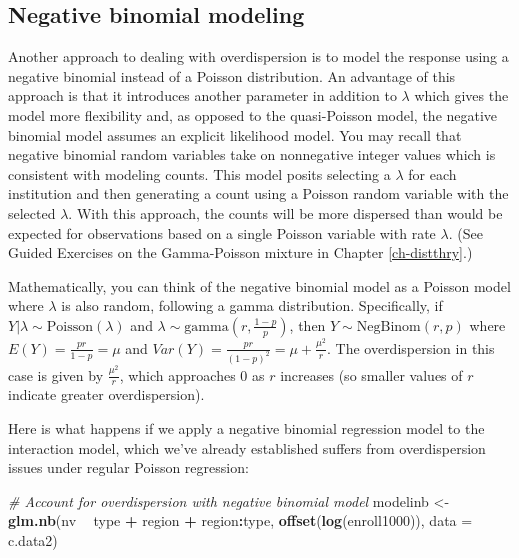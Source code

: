 \documentclass[
]{krantz}
\newenvironment{Shaded}{\begin{snugshade}}{\end{snugshade}}
\newcommand{\CommentTok}[1]{\textcolor[rgb]{0.37,0.37,0.37}{\textit{#1}}}
\newcommand{\DataTypeTok}[1]{\textcolor[rgb]{0.27,0.27,0.27}{#1}}
\newcommand{\KeywordTok}[1]{\textcolor[rgb]{0.27,0.27,0.27}{\textbf{#1}}}
\newcommand{\NormalTok}[1]{#1}
\newcommand{\OperatorTok}[1]{\textcolor[rgb]{0.43,0.43,0.43}{\textbf{#1}}}
\newcommand{\StringTok}[1]{\textcolor[rgb]{0.5,0.5,0.5}{#1}}
\begin{document}
\hypertarget{negative-binomial-modeling}{%
\subsection{Negative binomial modeling}\label{negative-binomial-modeling}}

Another approach to dealing with overdispersion is to model the response using a negative binomial instead of a Poisson distribution. An advantage of this approach is that it introduces another parameter in addition to \(\lambda\) which gives the model more flexibility and, as opposed to the quasi-Poisson model, the negative binomial model assumes an explicit likelihood model. You may recall that negative binomial random variables take on nonnegative integer values which is consistent with modeling counts. This model posits selecting a \(\lambda\) for each institution and then generating a count using a Poisson random variable with the selected \(\lambda\). With this approach, the counts will be more dispersed than would be expected for observations based on a single Poisson variable with rate \(\lambda\). (See Guided Exercises on the Gamma-Poisson mixture in Chapter \ref{ch-distthry}.)

Mathematically, you can think of the negative binomial model as a Poisson model where \(\lambda\) is also random, following a gamma distribution. Specifically, if \(Y|\lambda \sim \textrm{Poisson}(\lambda)\) and \(\lambda \sim \textrm{gamma}(r,\frac{1-p}{p})\), then \(Y \sim \textrm{NegBinom}(r,p)\) where \(E(Y)=\frac{pr}{1-p}=\mu\) and \(Var(Y)=\frac{pr}{(1-p)^2}=\mu+\frac{\mu^2}{r}\). The overdispersion in this case is given by \(\frac{\mu^2}{r}\), which approaches 0 as \(r\) increases (so smaller values of \(r\) indicate greater overdispersion).

Here is what happens if we apply a negative binomial regression model  to the interaction model, which we've already established suffers from overdispersion issues under regular Poisson regression:

\begin{Shaded}
\begin{Highlighting}[]
\CommentTok{# Account for overdispersion with negative binomial model}
\NormalTok{modelinb <-}\StringTok{ }\KeywordTok{glm.nb}\NormalTok{(nv }\OperatorTok{~}\StringTok{ }\NormalTok{type }\OperatorTok{+}\StringTok{ }\NormalTok{region }\OperatorTok{+}\StringTok{ }\NormalTok{region}\OperatorTok{:}\NormalTok{type, }
               \KeywordTok{offset}\NormalTok{(}\KeywordTok{log}\NormalTok{(enroll1000)), }\DataTypeTok{data =}\NormalTok{ c.data2)}
\end{Highlighting}
\end{Shaded}
\end{document}
